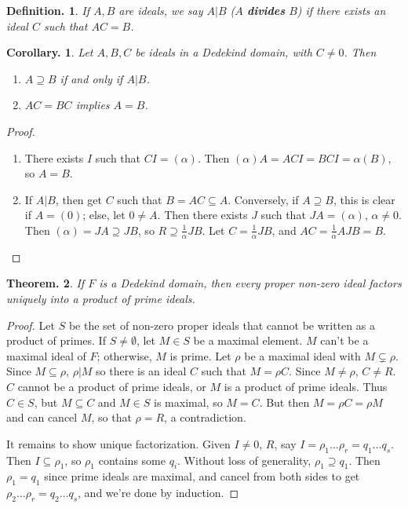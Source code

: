 \documentclass[11pt, a4paper]{memoir}
\theoremstyle{change}
\newtheorem{theorem}{Theorem.}[section]
\newtheorem{corollary}[theorem]{Corollary.}
\theoremstyle{plain}
\theoremstyle{nonumberplain}
\newtheorem{definition}{Definition.}
\newtheorem{proof}{Proof}
\numberwithin{equation}{section}
\begin{document}
\begin{definition}
    If $A,B$ are ideals, we say $A|B$ ($A$ \textbf{divides} $B$) if there exists an ideal $C$ such that $AC=B$.
\end{definition}
\begin{corollary}
    Let $A,B,C$ be ideals in a Dedekind domain, with $C\neq 0$.
    Then
    \begin{enumerate}[nolistsep,label=(\roman*)]
        \item $A\supseteq B$ if and only if $A|B$.
        \item $AC=BC$ implies $A=B$.
    \end{enumerate}
\end{corollary}
\begin{proof}
    \begin{enumerate}[label=(\roman*)]
        \item There exists $I$ such that $CI=(\alpha)$.
            Then $(\alpha)A=ACI=BCI=\alpha(B)$, so $A=B$.
        \item If $A|B$, then get $C$ such that $B=AC\subseteq A$.
            Conversely, if $A\supseteq B$, this is clear if $A=(0)$; else, let $0\neq A$.
            Then there exists $J$ such that $JA=(\alpha)$, $\alpha\neq 0$.
            Then $(\alpha)=JA\supseteq JB$, so $R\supseteq\frac{1}{\alpha}JB$.
            Let $C=\frac{1}{\alpha}JB$, and $AC=\frac{1}{\alpha}AJB=B$.
    \end{enumerate}
\end{proof}
\begin{theorem}
    If $F$ is a Dedekind domain, then every proper non-zero ideal factors uniquely into a product of prime ideals.
\end{theorem}
\begin{proof}
    Let $S$ be the set of non-zero proper ideals that cannot be written as a product of primes.
    If $S\neq\emptyset$, let $M\in S$ be a maximal element.
    $M$ can't be a maximal ideal of $F$; otherwise, $M$ is prime.
    Let $\rho$ be a maximal ideal with $M\subsetneq\rho$.
    Since $M\subseteq\rho$, $\rho|M$ so there is an ideal $C$ such that $M=\rho C$.
    Since $M\neq\rho$, $C\neq R$.
    $C$ cannot be a product of prime ideals, or $M$ is a product of prime ideals.
    Thus $C\in S$, but $M\subseteq C$ and $M\in S$ is maximal, so $M=C$.
    But then $M=\rho C=\rho M$ and can cancel $M$, so that $\rho=R$, a contradiction.

    It remains to show unique factorization.
    Given $I\neq 0$, $R$, say $I=\rho_1\ldots\rho_r=q_1\ldots q_s$.
    Then $I\subseteq\rho_1$, so $\rho_1$ contains some $q_i$.
    Without loss of generality, $\rho_1\supseteq q_1$.
    Then $\rho_1=q_1$ since prime ideals are maximal, and cancel from both sides to get $\rho_2\ldots\rho_r=q_2\ldots q_s$, and we're done by induction.
\end{proof}
\end{document}

